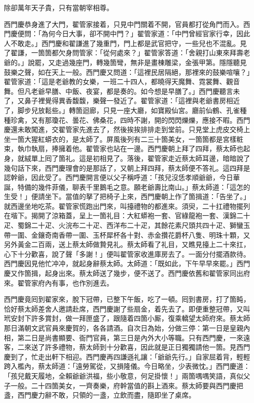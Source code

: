 除卻萬年天子貴，只有當朝宰相尊。

西門慶恭身進了大門，翟管家接着，只見中門關着不開，{}官員都打從角門而入。西門慶便問：「為何今日大事，卻不開中門？」翟管家道：「中門曾經官家行幸，因此人不敢走。」西門慶和翟謙進了幾重門，門上都是武官把守，一些兒也不混亂。見了翟謙，一箇箇都欠身問管家：「從何處來？」翟管家答道：「舍親打山東來拜壽老爺的。」說罷，又走過幾座門，轉幾箇彎，無非是畫棟雕梁，金張甲第。隱隱聽見鼓樂之聲，如在天上一般。西門慶又問道：「這裡民居隔絕，那裡來的鼓樂喧嚷？」翟管家道：「這是老爺教的女樂，一班二十四人，都曉得天魔舞、霓裳舞、觀音舞。但凡老爺早膳、中飯、夜宴，都是奏的。如今想是早膳了。」{}西門慶聽言未了，又鼻子裡覺得異香馥馥，樂聲一發近了。翟管家道：「這裡與老爺書房相近了，脚步兒放鬆些。」轉箇迴廊，只見一座大廳，如寶殿仙宮。廳前仙鶴、孔雀種種珍禽，又有那瓊花、曇花、佛桑花，四時不謝，開的閃閃爍爍，應接不暇。西門慶還未敢闖進，交翟管家先進去了，然後挨挨排排走到堂前。只見堂上虎皮交椅上坐一箇大猩紅蟒衣的，是太師了。屏風後列有二三十箇美女，一箇箇都是宮樣粧束，執巾執扇，捧擁着他。翟管家也站在一邊。西門慶朝上拜了四拜，蔡太師也起身，就絨單上囘了箇礼。這是初相見了。落後，翟管家走近蔡太師耳邊，暗暗說了幾句話下來，西門慶理會的是那話了，又朝上拜四拜，蔡太師便不答礼。這四拜是認幹爺，因此受了。{}西門慶開言便以父子稱呼道：「孩兒沒恁孝順爺爺，今日華誕，特備的幾件菲儀，聊表千里鵝毛之意。願老爺壽比南山。」蔡太師道：「這怎的生受！」便請坐下。當值的拏了把椅子上來，西門慶朝上作了箇揖道：「告坐了。」就西邊坐地吃茶。翟管家慌跑出門來，叫擡禮物的都進來。須臾，二十扛禮物擺列在堦下。揭開了涼箱蓋，呈上一箇礼目：大紅蟒袍一套、官綠龍袍一套、漢錦二十疋、蜀錦二十疋、火浣布二十疋、西洋布二十疋，其餘花素尺頭共四十疋、獅蠻玉帶一圍、金鑲奇南香帶一圍、玉杯犀杯各十對、赤金攢花爵杯八隻、明珠十顆，又另外黃金二百兩，送上蔡太師做贄見礼。蔡太師看了礼目，又瞧見擡上二十來扛，心下十分歡喜，說了聲「多謝！」便叫翟管家收進庫房去了。一面分付擺酒款待。西門慶因見他忙冲冲，就起身辭蔡太師。太師道：「既如此，下午早早來罷。」西門慶又作箇揖，起身出來。蔡太師送了幾步，便不送了。{}西門慶依舊和翟管家同出府來。翟管家府內有事，也作別進去。

西門慶竟囘到翟家來，脫下冠帶，已整下午飯，吃了一頓。囘到書房，打了箇盹，恰好蔡太師差舍人邀請赴席，西門慶謝了些扇金，着先去了。即便重整冠帶，又叫玳安封下許多賞封，做一拜匣盛了，跟隨着四箇小厮，復乘轎望太師府來。蔡太師那日滿朝文武官員來慶賀的，各各請酒。自次日為始，分做三停：第一日是皇親內相，第二日是尚書顯要、衙門官員，第三日是內外大小等職。只有西門慶，一來遠客，二來送了許多禮物，蔡太師到十分歡喜，因此就是正日獨獨請他一箇。見西門慶到了，忙走出軒下相迎。西門慶再四謙遜礼讓：「爺爺先行。」自家屈着背，輕輕跨入檻內，蔡太師道：「遠勞駕從，又損隆儀。今日略坐，少表微忱。」西門慶道：「孩兒戴天履地，全賴爺爺洪福，些小敬意，何足掛懷！」兩箇喁喁笑語，真似父子一般。{}二十四箇美女，一齊奏樂，府幹當值的斟上酒來。蔡太師要與西門慶把盞，西門慶力辭不敢，只領的一盞，立飲而盡，隨即坐了桌席。

